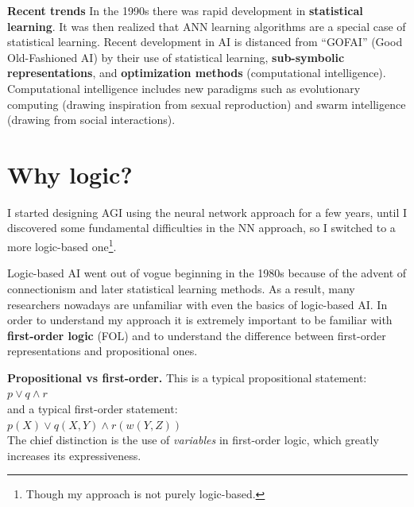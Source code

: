 \documentclass[a4paper]{report}
\begin{document}
\textbf{Recent trends}
In the 1990s there was rapid development in \textbf{statistical learning}.  It was then realized that ANN learning algorithms are a special case of statistical learning.  Recent development in AI is distanced from ``GOFAI'' (Good Old-Fashioned AI) by their use of statistical learning, \textbf{sub-symbolic representations}, and \textbf{optimization methods} (computational intelligence).  Computational intelligence includes new paradigms such as evolutionary computing (drawing inspiration from sexual reproduction) and swarm intelligence (drawing from social interactions).

\section{Why logic?}
\label{sec:why-logic}

I started designing AGI using the neural network approach for a few years, until I discovered some fundamental difficulties in the NN approach, so I switched to a more logic-based one\footnote{Though my approach is not purely logic-based.}.

Logic-based AI went out of vogue beginning in the 1980s because of the advent of connectionism and later statistical learning methods.  As a result, many researchers nowadays are unfamiliar with even the basics of logic-based AI.  In order to understand my approach it is extremely important to be familiar with \textbf{first-order logic} (FOL) and to understand the difference between first-order representations and propositional ones.

\textbf{Propositional vs first-order.}  This is a typical propositional statement:\\
\hspace*{1cm} $ p \vee q \wedge r $\\
and a typical first-order statement:\\
\hspace*{1cm} $ p(X) \vee q(X,Y) \wedge r(w(Y,Z)) $\\
The chief distinction is the use of \emph{variables} in first-order logic, which greatly increases its expressiveness.
\end{document}
